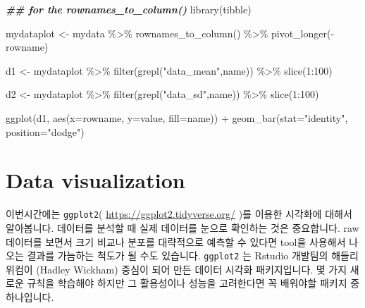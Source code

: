 \documentclass[
]{book}
\newenvironment{Shaded}{\begin{snugshade}}{\end{snugshade}}
\newcommand{\AttributeTok}[1]{\textcolor[rgb]{0.77,0.63,0.00}{#1}}
\newcommand{\DecValTok}[1]{\textcolor[rgb]{0.00,0.00,0.81}{#1}}
\newcommand{\DocumentationTok}[1]{\textcolor[rgb]{0.56,0.35,0.01}{\textbf{\textit{#1}}}}
\newcommand{\FunctionTok}[1]{\textcolor[rgb]{0.00,0.00,0.00}{#1}}
\newcommand{\NormalTok}[1]{#1}
\newcommand{\OtherTok}[1]{\textcolor[rgb]{0.56,0.35,0.01}{#1}}
\newcommand{\SpecialCharTok}[1]{\textcolor[rgb]{0.00,0.00,0.00}{#1}}
\newcommand{\StringTok}[1]{\textcolor[rgb]{0.31,0.60,0.02}{#1}}
\begin{document}
\begin{Shaded}
\begin{Highlighting}[]
\DocumentationTok{\#\# for the rownames\_to\_column()}
\FunctionTok{library}\NormalTok{(tibble)}

\NormalTok{mydataplot }\OtherTok{\textless{}{-}}\NormalTok{ mydata }\SpecialCharTok{\%\textgreater{}\%} 
  \FunctionTok{rownames\_to\_column}\NormalTok{() }\SpecialCharTok{\%\textgreater{}\%} 
  \FunctionTok{pivot\_longer}\NormalTok{(}\SpecialCharTok{{-}}\NormalTok{rowname)}
  
\NormalTok{d1 }\OtherTok{\textless{}{-}}\NormalTok{ mydataplot }\SpecialCharTok{\%\textgreater{}\%} 
  \FunctionTok{filter}\NormalTok{(}\FunctionTok{grepl}\NormalTok{(}\StringTok{"data\_mean"}\NormalTok{,name)) }\SpecialCharTok{\%\textgreater{}\%} 
  \FunctionTok{slice}\NormalTok{(}\DecValTok{1}\SpecialCharTok{:}\DecValTok{100}\NormalTok{) }

\NormalTok{d2 }\OtherTok{\textless{}{-}}\NormalTok{ mydataplot }\SpecialCharTok{\%\textgreater{}\%} 
  \FunctionTok{filter}\NormalTok{(}\FunctionTok{grepl}\NormalTok{(}\StringTok{"data\_sd"}\NormalTok{,name)) }\SpecialCharTok{\%\textgreater{}\%} 
  \FunctionTok{slice}\NormalTok{(}\DecValTok{1}\SpecialCharTok{:}\DecValTok{100}\NormalTok{) }

\FunctionTok{ggplot}\NormalTok{(d1, }\FunctionTok{aes}\NormalTok{(}\AttributeTok{x=}\NormalTok{rowname, }\AttributeTok{y=}\NormalTok{value, }\AttributeTok{fill=}\NormalTok{name)) }\SpecialCharTok{+}
    \FunctionTok{geom\_bar}\NormalTok{(}\AttributeTok{stat=}\StringTok{"identity"}\NormalTok{, }\AttributeTok{position=}\StringTok{"dodge"}\NormalTok{) }
  
\end{Highlighting}
\end{Shaded}

\hypertarget{data-visualization}{%
\chapter{Data visualization}\label{data-visualization}}

이번시간에는 \texttt{ggplot2}( \url{https://ggplot2.tidyverse.org/} )를 이용한 시각화에 대해서 알아봅니다. 데이터를 분석할 때 실제 데이터를 눈으로 확인하는 것은 중요합니다. raw 데이터를 보면서 크기 비교나 분포를 대략적으로 예측할 수 있다면 tool을 사용해서 나오는 결과를 가늠하는 척도가 될 수도 있습니다. \texttt{ggplot2} 는 Rstudio 개발팀의 해들리위컴이 (Hadley Wickham) 중심이 되어 만든 데이터 시각화 패키지입니다. 몇 가지 새로운 규칙을 학습해야 하지만 그 활용성이나 성능을 고려한다면 꼭 배워야할 패키지 중 하나입니다.
\end{document}
